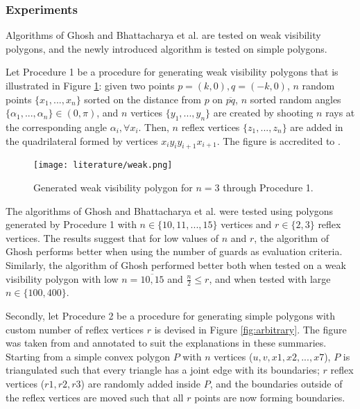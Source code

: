 \subsubsection{Experiments}
Algorithms of Ghosh \cite{GHOSH2010718} and Bhattacharya et al. \cite{bhattacharya2016approximability} are tested on weak visibility polygons, and the newly introduced algorithm is tested on simple polygons. 

Let Procedure 1 be a procedure for generating weak visibility polygons that is illustrated in Figure \ref{fig:weak}: given two points $p = (k, 0), q = (-k, 0)$,  $n$ random points $\{x_1, ..., x_n\}$ sorted on the distance from $p$ on $\overline{pq}$, $n$ sorted random angles $\{\alpha_1, ..., \alpha_n\} \in  (0, \pi)$, and $n$ vertices $\{y_1, ..., y_n\}$ are created by shooting $n$ rays at the corresponding angle $\alpha_i, \forall x_i$. Then, $n$ reflex vertices $\{z_1, ..., z_n\}$ are added in the quadrilateral formed by vertices $x_iy_iy_{i + 1}x_{i + 1}$. The figure is accredited to \cite{maleki2022implementation}.

\begin{figure}[h!]
    \centering
    \texttt{[image: literature/weak.png]}
    \caption{Generated weak visibility polygon for $n = 3$ \cite{maleki2022implementation} through Procedure 1.}
    \label{fig:weak}
\end{figure}

The algorithms of Ghosh \cite{GHOSH2010718} and Bhattacharya et al. \cite{bhattacharya2016approximability} were tested using polygons generated by Procedure 1 with $n \in \{10, 11, ..., 15\}$ vertices and $r \in \{2, 3\}$ reflex vertices. The results suggest that for low values of $n$ and $r$, the algorithm of Ghosh \cite{GHOSH2010718} performs better when using the number of guards as evaluation criteria. 
Similarly, the algorithm of Ghosh \cite{GHOSH2010718} performed better both when tested on a weak visibility polygon with low $n = \overline{10, 15}$ and $\frac n 2 \leq r$, and when tested with large $n \in \{100, 400\}$.

Secondly, let Procedure 2 be a procedure for generating simple polygons with custom number of reflex vertices $r$ is devised in Figure \ref{fig:arbitrary}. The figure was taken from \cite{maleki2022implementation} and annotated to suit the explanations in these summaries. Starting from a simple convex polygon $P$ with $n$ vertices ($u, v, x1, x2, ..., x7$), $P$ is triangulated such that every triangle has a joint edge with its boundaries; $r$ reflex vertices ($r1, r2, r3$) are randomly added inside $P$, and the boundaries outside of the reflex vertices are moved such that all $r$ points are now forming boundaries. 

